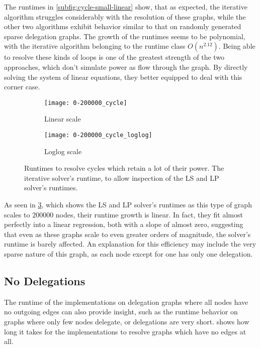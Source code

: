 The runtimes in \cref{subfig:cycle-small-linear} show, that as expected, the iterative algorithm struggles considerably with the resolution of these graphs, while the other two algorithms exhibit behavior similar to that on randomly generated sparse delegation graphs. The growth of the runtimes seems to be polynomial, with the iterative algorithm belonging to the runtime class $O(n^{2.12})$. Being able to resolve these kinds of loops is one of the greatest strength of the two approaches, which don't simulate power as flow through the graph. By directly solving the system of linear equations, they better equipped to deal with this corner case.  

\begin{figure}[t]
    \centering
    \begin{subfigure}[t]{0.45\textwidth}
    	\centering
    	\texttt{[image: 0-200000\_cycle]}
    	\caption{Linear scale}
    	\label{subfig:cycle-large-linear}
    \end{subfigure}
    \hfill
    \begin{subfigure}[t]{0.45\textwidth}
        \centering
        \texttt{[image: 0-200000\_cycle\_loglog]}
        \caption{Loglog scale}
         \label{subfig:cycle-large-loglog}
    \end{subfigure}
    \caption{Runtimes to resolve cycles which retain a lot of their power. The iterative solver's runtime, to allow inspection of the LS and LP solver's runtimes.}
    \label{fig:cycle_large}
\end{figure}

As seen in \cref{fig:cycle_large}, which shows the LS and LP solver's runtimes as this type of graph scales to $200 000$ nodes, their runtime growth is linear. In fact, they fit almost perfectly into a linear regression, both with a slope of almost zero, suggesting that even as these graphs scale to even greater orders of magnitude, the solver's runtime is barely affected. An explanation for this efficiency may include the very sparse nature of this graph, as each node except for one has only one delegation.

\subsection{No Delegations}

The runtime of the implementations on delegation graphs where all nodes have no outgoing edges can also provide insight, such as the runtime behavior on graphs where only few nodes delegate, or delegations are very short.  shows how long it takes for the implementations to resolve graphs which have no edges at all. 

